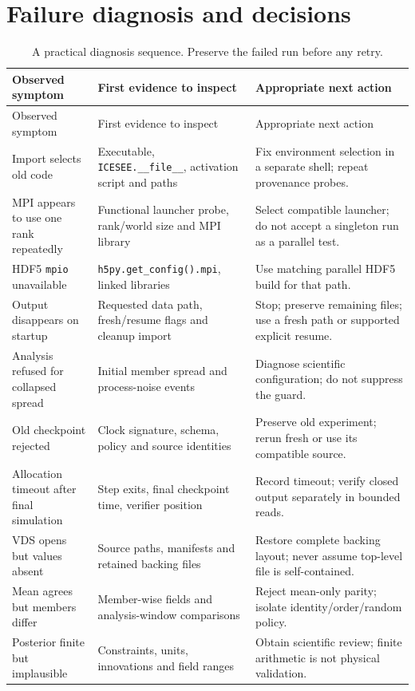 \documentclass[11pt,a4paper]{article}
\newcommand{\code}[1]{\nolinkurl{#1}}
\begin{document}
\section{Failure diagnosis and decisions}
\begin{longtable}{p{.25\linewidth}p{.32\linewidth}p{.35\linewidth}}
\caption{A practical diagnosis sequence. Preserve the failed run before any retry.}\\\toprule
Observed symptom & First evidence to inspect & Appropriate next action\\\midrule\endfirsthead
\toprule Observed symptom & First evidence to inspect & Appropriate next action\\\midrule\endhead
Import selects old code & Executable, \code{ICESEE.__file__}, activation script and paths & Fix environment selection in a separate shell; repeat provenance probes.\\
MPI appears to use one rank repeatedly & Functional launcher probe, rank/world size and MPI library & Select compatible launcher; do not accept a singleton run as a parallel test.\\
HDF5 \code{mpio} unavailable & \code{h5py.get_config().mpi}, linked libraries & Use matching parallel HDF5 build for that path.\\
Output disappears on startup & Requested data path, fresh/resume flags and cleanup import & Stop; preserve remaining files; use a fresh path or supported explicit resume.\\
Analysis refused for collapsed spread & Initial member spread and process-noise events & Diagnose scientific configuration; do not suppress the guard.\\
Old checkpoint rejected & Clock signature, schema, policy and source identities & Preserve old experiment; rerun fresh or use its compatible source.\\
Allocation timeout after final simulation & Step exits, final checkpoint time, verifier position & Record timeout; verify closed output separately in bounded reads.\\
VDS opens but values absent & Source paths, manifests and retained backing files & Restore complete backing layout; never assume top-level file is self-contained.\\
Mean agrees but members differ & Member-wise fields and analysis-window comparisons & Reject mean-only parity; isolate identity/order/random policy.\\
Posterior finite but implausible & Constraints, units, innovations and field ranges & Obtain scientific review; finite arithmetic is not physical validation.\\
\bottomrule
\end{longtable}
\end{document}
